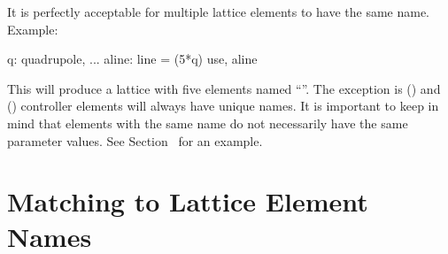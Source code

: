 It is perfectly acceptable for multiple lattice elements to have the same name. Example:
\begin{example}
  q: quadrupole, ...
  aline: line = (5*q)
  use, aline
\end{example}
This will produce a lattice with five elements named ``''. The exception is 
() and  () controller elements will always have unique
names. It is important to keep in mind that elements with the same name do not necessarily have
the same parameter values. See Section~ for an example. 

\section{Matching to Lattice Element Names}
\label{s:ele.match}

